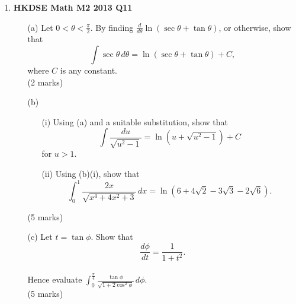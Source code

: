 \documentclass{report}
\begin{document}
\begin{enumerate}
	\item \textbf{HKDSE Math M2 2013 Q11}
	\begin{enumerate}
		\item [(a)]Let $0 < \theta < \displaystyle\frac{\pi}{2}$. By finding $\displaystyle\frac{d}{d\theta} \ln{(\sec{\theta} + \tan{\theta})}$, or otherwise, show that $$\displaystyle\int\sec{\theta}\,d\theta =\ln{(\sec{\theta} + \tan{\theta})} + C,$$where $C$ is any constant. \\(2 marks)
		\item [(b)]
		\begin{enumerate}
			\item [(i)]Using (a) and a suitable substitution, show that $$\displaystyle\int\frac{du}{\sqrt{u^2-1}} = \ln{(u + \sqrt{u^2-1})} + C$$ for $u > 1$.
			\item [(ii)]Using (b)(i), show that $$\displaystyle\int_{0}^{1}\frac{2x}{\sqrt{x^4+4x^2+3}}\,dx = \ln{(6 + 4\sqrt{2} - 3\sqrt{3} - 2\sqrt{6})}.$$
		\end{enumerate}
		(5 marks)
		\item [(c)]Let $t = \tan{\phi}$. Show that $$\displaystyle\frac{d\phi}{dt} = \frac{1}{1+t^2}.$$ \\
		Hence evaluate $\displaystyle\int_0^{\tfrac{\pi}{4}}\frac{\tan{\phi}}{\sqrt{1+2\cos^2{\phi}}}\,d\phi$. \\(5 marks)
	\end{enumerate}

	\newpage


\end{enumerate}
\end{document}
